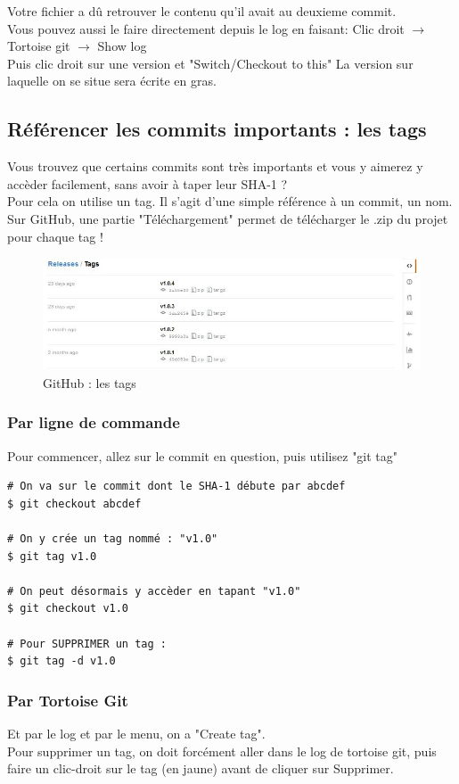Votre fichier a dû retrouver le contenu qu'il avait au deuxieme commit.\\

Vous pouvez aussi le faire directement depuis le log en faisant:
Clic droit $\rightarrow$ Tortoise git $\rightarrow$ Show log\\

Puis clic droit sur une version et "Switch/Checkout to this"
La version sur laquelle on se situe sera écrite en gras.
\newpage
\subsection{Référencer les commits importants : les tags}
Vous trouvez que certains commits sont très importants et vous y aimerez y accèder facilement, sans avoir à taper leur SHA-1 ? \\

Pour cela on utilise un tag. Il s'agit d'une simple référence à un commit, un nom.\\

Sur GitHub, une partie "Téléchargement" permet de télécharger le .zip du projet pour chaque tag !

\begin{figure}[h] 
	\begin{center}
		\includegraphics[scale=0.4]{../IMG/tagsdl.jpg}
	\end{center}
	\caption{GitHub : les tags}
	\label{GitHub : les tags} 
\end{figure}

\subsubsection{Par ligne de commande}
Pour commencer, allez sur le commit en question, puis utilisez "git tag"
\begin{verbatim}
# On va sur le commit dont le SHA-1 débute par abcdef
$ git checkout abcdef

# On y crée un tag nommé : "v1.0"
$ git tag v1.0

# On peut désormais y accèder en tapant "v1.0"
$ git checkout v1.0

# Pour SUPPRIMER un tag :
$ git tag -d v1.0
\end{verbatim}

\subsubsection{Par Tortoise Git}
Et par le log et par le menu, on a "Create tag".\\

Pour supprimer un tag, on doit forcément aller dans le log de tortoise git, puis faire un clic-droit sur le tag (en jaune) avant de cliquer sur Supprimer.